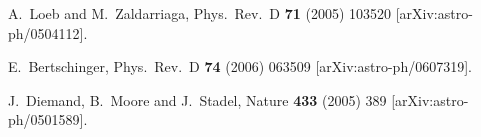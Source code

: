 \begin{thebibliography}{99}
  A.~Loeb and M.~Zaldarriaga,
  Phys.\ Rev.\  D {\bf 71} (2005) 103520
  [arXiv:astro-ph/0504112].

  E.~Bertschinger,
  Phys.\ Rev.\  D {\bf 74} (2006) 063509
  [arXiv:astro-ph/0607319].

  J.~Diemand, B.~Moore and J.~Stadel,
  Nature {\bf 433} (2005) 389
  [arXiv:astro-ph/0501589].


\end{thebibliography}



